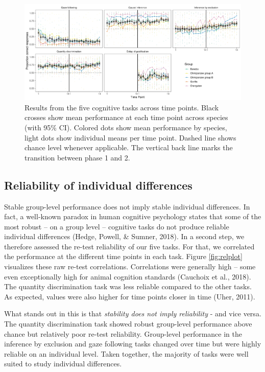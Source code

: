 \documentclass[
  man,floatsintext]{apa6}
\begin{document}
\begin{figure}
\includegraphics[width=1\linewidth]{./figures/performance} \caption{Results from the five cognitive tasks across time points. Black crosses show mean performance at each time point across species (with 95\% CI). Colored dots show mean performance by species, light dots show individual means per time point. Dashed line shows chance level whenever applicable. The vertical back line marks the transition between phase 1 and 2.}\label{fig:perfplot}
\end{figure}

\hypertarget{reliability-of-individual-differences}{%
\subsection{Reliability of individual differences}\label{reliability-of-individual-differences}}

Stable group-level performance does not imply stable individual differences. In fact, a well-known paradox in human cognitive psychology states that some of the most robust -- on a group level -- cognitive tasks do not produce reliable individual differences (Hedge, Powell, \& Sumner, 2018). In a second step, we therefore assessed the re-test reliability of our five tasks. For that, we correlated the performance at the different time points in each task. Figure \ref{fig:relplot} visualizes these raw re-test correlations. Correlations were generally high -- some even exceptionally high for animal cognition standards (Cauchoix et al., 2018). The quantity discrimination task was less reliable compared to the other tasks. As expected, values were also higher for time points closer in time (Uher, 2011).

What stands out in this is that \emph{stability does not imply reliability} - and vice versa. The quantity discrimination task showed robust group-level performance above chance but relatively poor re-test reliability. Group-level performance in the inference by exclusion and gaze following tasks changed over time but were highly reliable on an individual level. Taken together, the majority of tasks were well suited to study individual differences.
\end{document}
